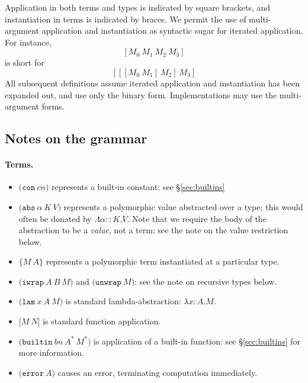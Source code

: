 \documentclass[a4paper]{article}
\newcommand{\keyword}[1]{\texttt{#1}}
\newcommand{\construct}[1]{\texttt{(} #1 \texttt{)}}
\newcommand{\con}[1]{\construct{\keyword{con} ~ #1}}
\newcommand{\abs}[3]{\construct{\keyword{abs} ~ #1 ~ #2 ~ #3}}
\newcommand{\inst}[2]{\texttt{\{}#1 ~ #2\texttt{\}}}
\newcommand{\lam}[3]{\construct{\keyword{lam} ~ #1 ~ #2 ~ #3}}
\newcommand{\app}[2]{\texttt{[} #1 ~ #2 \texttt{]}}
\newcommand{\iwrap}[3]{\construct{\keyword{iwrap} ~ #1 ~ #2 ~ #3}}
\newcommand{\unwrap}[1]{\construct{\keyword{unwrap} ~ #1}}
\newcommand{\builtin}[3]{\construct{\keyword{builtin} ~ #1 ~ #2 ~ #3}}
\newcommand{\error}[1]{\construct{\keyword{error} ~ #1}}
\begin{document}
Application in both terms and types is indicated by square
brackets, and instantiation in terms is indicated by braces. We
permit the use of multi-argument application and instantiation as
syntactic sugar for iterated application.
For instance,
\[
  [M_0 ~ M_1 ~ M_2 ~ M_3]
  \]
\noindent is short for
\[
  [[[M_0 ~ M_1] ~ M_2] ~ M_3]
\]
All subsequent definitions assume iterated application and instantiation
has been expanded out, and use only the binary form. Implementations
may use the multi-argument forms.






\newcommand\fixtype[1]{\mu\,\alpha.#1}  %

\subsection{Notes on the grammar}
\paragraph{Terms.}
\begin{itemize}
\item $\con{cn}$ represents a built-in constant: see \S\ref{sec:builtins}
\item $\abs{\alpha}{K}{V}$ represents a polymorphic value abstracted
  over a type; this would often be donated by $\Lambda\alpha{::}K.V$.
  Note that we require the body of the abstraction to be a
  \textit{value}, not a term: see the note on the value restriction below.
\item $\inst{M}{A}$ represents a polymorphic term instantiated at a particular type.
\item $\iwrap{A}{B}{M}$ and $\unwrap{M}$: see the note on recursive types below.
\item $\lam{x}{A}{M}$ is standard lambda-abstraction: $\lambda{}x{:}{A}.{M}$.
\item $\app{M}{N}$ is standard function application.
\item $\builtin{bn}{A^*}{M^*}$ is application of a built-in function: see \S\ref{sec:builtins} for more information.
\item $\error{A}$ causes an error, terminating computation immediately.
\end{itemize}

\end{document}
